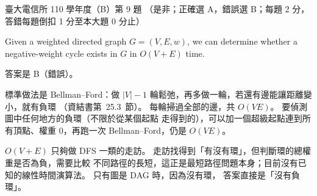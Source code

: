 \begin{pastexam}[label={px:ntu-110-comm-dsa-09}]{臺大電信所 110 學年度（B）第 9 題}
（是非；正確選 A，錯誤選 B；每題 2 分，答錯每題倒扣 1 分至本大題 0 分止）

Given a weighted directed graph $G=(V,E,w)$, we can determine whether a negative-weight cycle exists in $G$ in $O(V+E)$ time.
\end{pastexam}

\begin{pastsoln}
答案是 B（錯誤）。

標準做法是 Bellman--Ford：做 $|V| - 1$ 輪鬆弛，再多做一輪，若還有邊能讓距離變小，就有負環
（資結書第~25.3~節）。 每輪掃過全部的邊，共 $O(VE)$。 要偵測圖中任何地方的負環（不限於從某個起點
走得到的），可以加一個超級起點連到所有頂點、權重 $0$，再跑一次 Bellman--Ford，仍是 $O(VE)$。

$O(V + E)$ 只夠做 DFS 一類的走訪。 走訪找得到「有沒有環」，但判斷環的總權重是否為負，需要比較
不同路徑的長短，這正是最短路徑問題本身；目前沒有已知的線性時間演算法。 只有圖是 DAG 時，因為沒有環，
答案直接是「沒有負環」。
\end{pastsoln}
